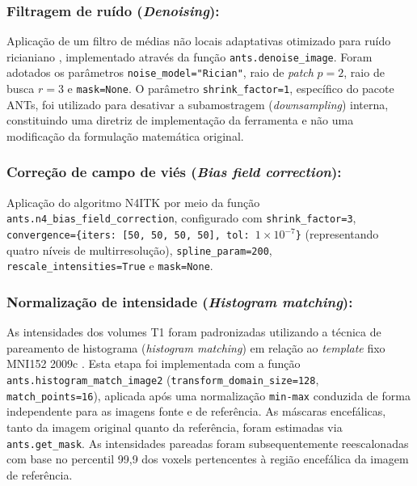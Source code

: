 \documentclass[review]{elsarticle}
\newcommand{\code}[1]{\texttt{#1}}
\begin{document}
	\subsubsection{Filtragem de ruído (\emph{Denoising}):} Aplicação de um filtro de médias não locais adaptativas otimizado para ruído ricianiano \cite{manjon-2010}, implementado através da função \code{ants.denoise\_image}. Foram adotados os parâmetros \code{noise\_model="Rician"}, raio de \emph{patch} $p=2$, raio de busca $r=3$ e \code{mask=None}. O parâmetro \code{shrink\_factor=1}, específico do pacote ANTs, foi utilizado para desativar a subamostragem (\emph{downsampling}) interna, constituindo uma diretriz de implementação da ferramenta e não uma modificação da formulação matemática original.
	
	\subsubsection{Correção de campo de viés (\emph{Bias field correction}):} Aplicação do algoritmo N4ITK \cite{tustison-2010} por meio da função \code{ants.n4\_bias\_field\_correction}, configurado com \code{shrink\_factor=3}, \code{convergence=\{iters: [50, 50, 50, 50], tol: }\(1\times10^{-7}\)\code{\}} (representando quatro níveis de multirresolução), \code{spline\_param=200}, \code{rescale\_intensities=True} e \code{mask=None}.
	
	\subsubsection{Normalização de intensidade (\emph{Histogram matching}):} As intensidades dos volumes T1 foram padronizadas utilizando a técnica de pareamento de histograma (\emph{histogram matching}) \cite{nyul-2000} em relação ao \emph{template} fixo MNI152 2009c \cite{fonov-2011}. Esta etapa foi implementada com a função \code{ants.histogram\_match\_image2} (\code{transform\_domain\_size=128}, \code{match\_points=16}), aplicada após uma normalização \code{min-max} conduzida de forma independente para as imagens fonte e de referência. As máscaras encefálicas, tanto da imagem original quanto da referência, foram estimadas via \code{ants.get\_mask}. As intensidades pareadas foram subsequentemente reescalonadas com base no percentil 99,9 dos voxels pertencentes à região encefálica da imagem de referência. 
	
\end{document}
